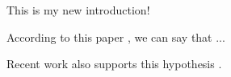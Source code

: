 
This is my new introduction!

According to this paper \cite{Breiman2001a}, we can say that ...

Recent work also supports this hypothesis \cite{Tibshirani1996}.